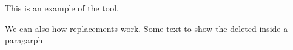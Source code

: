 \documentclass{article}
\begin{document}
This is an  example of the tool.


We can also  how replacements work.
Some text to show the deleted inside a paragarph
\end{document}
